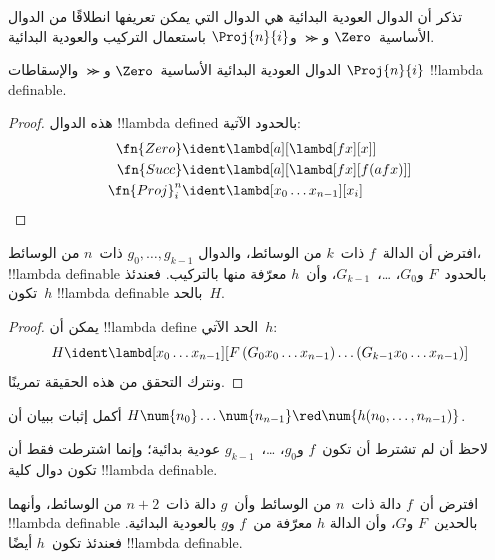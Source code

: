 \documentclass[../../../include/open-logic-section]{subfiles}
\begin{document}

تذكر أن الدوال العودية البدائية هي الدوال التي يمكن تعريفها انطلاقًا
من الدوال الأساسية~$\Zero$ و$\Succ$ و$\Proj{n}{i}$ باستعمال التركيب
والعودية البدائية.

\begin{lem}
  الدوال العودية البدائية الأساسية~$\Zero$ و$\Succ$ والإسقاطات
  $\Proj{n}{i}$ !!{lambda definable}.
\end{lem}

\begin{proof}
هذه الدوال !!{lambda defined} بالحدود الآتية:
\begin{align*}
  \fn{Zero} & \ident \lambd[a][\lambd[fx][x]]\\
  \fn{Succ} & \ident \lambd[a][\lambd[fx][f (a f x)]] \\
  \fn{Proj}^n_i & \ident \lambd[x_0\dots x_{n-1}][x_i]
\end{align*}
\end{proof}

\begin{lem}
   افترض أن الدالة~$f$ ذات~$k$ من الوسائط، والدوال
  $g_0, \dots, g_{k-1}$ ذات~$n$ من الوسائط، !!{lambda definable}
  بالحدود~$F$ و$G_0$، \dots،~$G_{k-1}$، وأن~$h$ معرّفة منها
  بالتركيب. فعندئذ تكون~$h$ !!{lambda definable} بالحد~$H$.
\end{lem}

\begin{proof}
  يمكن أن !!{lambda define} الحد الآتي~$h$:
  \[
  H \ident \lambd[x_0 \dots x_{n-1}][F\, (G_0 x_0 \dots
    x_{n-1}) \dots (G_{k-1} x_0 \dots x_{n-1})]
  \]
  ونترك التحقق من هذه الحقيقة تمرينًا.
\end{proof}

\begin{prob}
  أكمل إثبات  ببيان أن
  $H\num{n_0}\dots\num{n_{n-1}} \red \num{h(n_0, \dots,
    n_{n-1})}$.
\end{prob}

لاحظ أن  لم تشترط أن تكون~$f$ و$g_0$،
\dots،~$g_{k-1}$ عودية بدائية؛ وإنما اشترطت فقط أن تكون دوال كلية
!!{lambda definable}.

\begin{lem}
  افترض أن~$f$ دالة ذات~$n$ من الوسائط وأن~$g$ دالة ذات~$n+2$ من
  الوسائط، وأنهما !!{lambda definable} بالحدين~$F$ و$G$، وأن الدالة
  $h$ معرّفة من~$f$ و$g$ بالعودية البدائية. فعندئذ تكون~$h$ أيضًا
  !!{lambda definable}.
\end{lem}
\end{document}
